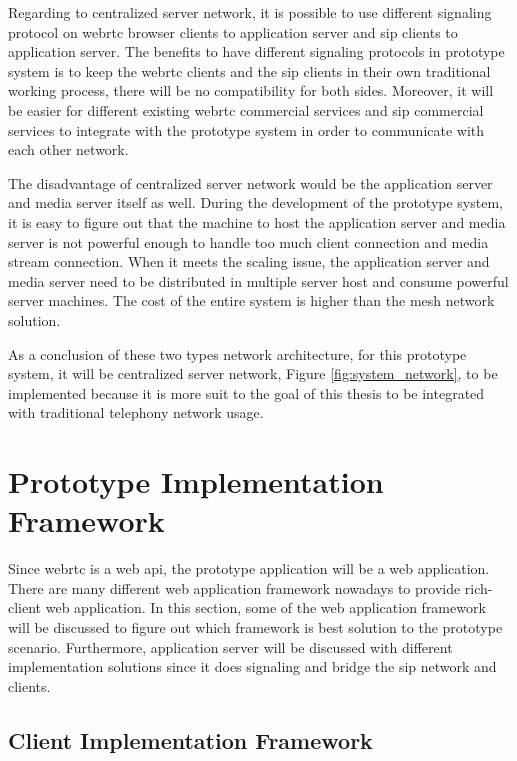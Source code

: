 \par Regarding to centralized server network, it is possible to use different signaling protocol on \gls{webrtc} browser clients to application server and \gls{sip} clients to application server. The benefits to have different signaling protocols in prototype system is to keep the \gls{webrtc} clients and the \gls{sip} clients in their own traditional working process, there will be no compatibility for both sides. Moreover, it will be easier for different existing \gls{webrtc} commercial services and \gls{sip} commercial services to integrate with the prototype system in order to communicate with each other network.

\par The disadvantage of centralized server network would be the application server and media server itself as well. During the development of the prototype system, it is easy to figure out that the machine to host the application server and media server is not powerful enough to handle too much client connection and media stream connection. When it meets the scaling issue, the application server and media server need to be distributed in multiple server host and consume powerful server machines. The cost of the entire system is higher than the mesh network solution.

\par As a conclusion of these two types network architecture, for this prototype system, it will be centralized server network, Figure \ref{fig:system_network}, to be implemented because it is more suit to the goal of this thesis to be integrated with traditional telephony network usage.

\section{Prototype Implementation Framework}

\noindent Since \gls{webrtc} is a web \gls{api}, the prototype application will be a web application. There are many different web application framework nowadays to provide rich-client web application. In this section, some of the web application framework will be discussed to figure out which framework is best solution to the prototype scenario. Furthermore, application server will be discussed with different implementation solutions since it does signaling and bridge the \gls{sip} network and clients.

\subsection{Client Implementation Framework}

